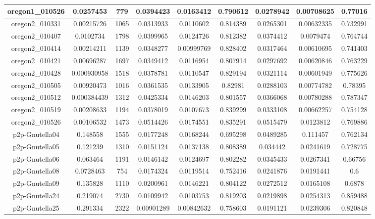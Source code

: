 \documentclass[10]{article}
\begin{document}
\begin{table}
{\begin{tabular}{|c|c|c|c|c|c|c|c|c|}
\hline
oregon1\_010526&0.0257453 & 779 & 0.0394423 & 0.0163412 & 0.790612 & 0.0278942 & 0.00708625 & 0.77016 \\
\hline
oregon2\_010331&0.00215726 & 1065 & 0.0313933 & 0.0110602 & 0.814389 & 0.0265301 & 0.00632335 & 0.732991 \\
\hline
oregon2\_010407&0.0102734 & 1798 & 0.0399965 & 0.0124726 & 0.812382 & 0.0374412 & 0.0079474 & 0.764744 \\
\hline
oregon2\_010414&0.00214211 & 1139 & 0.0348277 & 0.00999769 & 0.828402 & 0.0317464 & 0.00610695 & 0.741403 \\
\hline
oregon2\_010421&0.00696287 & 1697 & 0.0349412 & 0.0116954 & 0.807914 & 0.0297692 & 0.00620846 & 0.763229 \\
\hline
oregon2\_010428&0.000930958 & 1518 & 0.0378781 & 0.0110547 & 0.829194 & 0.0321114 & 0.00601949 & 0.775626 \\
\hline
oregon2\_010505&0.00920473 & 1016 & 0.0361535 & 0.0133905 & 0.82981 & 0.0288103 & 0.00774782 & 0.78395 \\
\hline
oregon2\_010512&0.000384439 & 1312 & 0.0425334 & 0.0146203 & 0.801557 & 0.0366068 & 0.00780288 & 0.787347 \\
\hline
oregon2\_010519&0.00208633 & 1194 & 0.0378019 & 0.0107673 & 0.839299 & 0.0333108 & 0.00662257 & 0.754128 \\
\hline
oregon2\_010526&0.00106532 & 1473 & 0.0514426 & 0.0174551 & 0.835291 & 0.0515479 & 0.0123812 & 0.769886 \\
\hline
p2p-Gnutella04&0.148558 & 1555 & 0.0177248 & 0.0168244 & 0.695298 & 0.0489285 & 0.111457 & 0.762134 \\
\hline
p2p-Gnutella05&0.121239 & 1310 & 0.0151124 & 0.0137138 & 0.808389 & 0.034442 & 0.0241619 & 0.728775 \\
\hline
p2p-Gnutella06&0.063464 & 1191 & 0.0146142 & 0.0124697 & 0.802282 & 0.0345433 & 0.0267341 & 0.66756 \\
\hline
p2p-Gnutella08&0.0728463 & 754 & 0.0174324 & 0.0119514 & 0.752416 & 0.0241876 & 0.0191441 & 0.6 \\
\hline
p2p-Gnutella09&0.135828 & 1110 & 0.0200961 & 0.0146221 & 0.804122 & 0.0272512 & 0.0165108 & 0.6878 \\
\hline
p2p-Gnutella24&0.219074 & 2730 & 0.0109942 & 0.0103753 & 0.819203 & 0.0219898 & 0.0254313 & 0.859488 \\
\hline
p2p-Gnutella25&0.291334 & 2322 & 0.00901289 & 0.00842632 & 0.758603 & 0.0191121 & 0.0239306 & 0.820848 \\
\hline

\end{tabular}}
\end{table}
\end{document}
